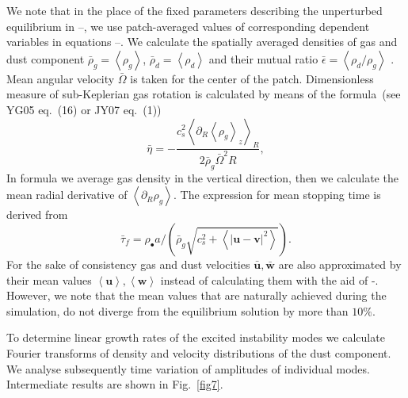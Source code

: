 We note that in the place of the fixed parameters  describing the unperturbed
equilibrium  in --, we use patch-averaged values of
corresponding dependent variables in equations --. 
We calculate the spatially averaged densities of gas and dust component
$\bar{\rho}_g = \left<\rho_g\right>$, $\bar{\rho}_d = \left<\rho_d\right>$ and
their mutual ratio $\bar{\epsilon} = \left<\rho_d / \rho_g\right>$ . Mean
angular velocity $\bar{\Omega}$ is taken for the center of the patch.
Dimensionless measure of sub-Keplerian gas rotation is calculated by means of
the formula~(see YG05 eq.~(16) or JY07 eq.~(1))
%
\begin{equation}
   \bar{\eta} = -\frac{c_s^2\left<\partial_R \left<\rho_g\right>_z\right>_R}
      {2\bar{\rho}_g\bar{\Omega}^2 R},
   \label{eq:eta}
\end{equation}
%
In formula  we average gas density in the vertical direction, then
we calculate the mean radial derivative of $\left<\partial_R \rho_g\right>$. 
The expression for mean stopping time is derived from 
\begin{equation}
   \bar{\tau}_f = \rho_\bullet a / \left(\bar{\rho}_g \sqrt{c_s^2 +
   \left<\left|\mathbf{u} - \mathbf{v}\right|^2\right>} \right).
\end{equation}
%
For the sake of consistency gas and dust velocities $\bar{\mathbf{u}},
\bar{\mathbf{w}}$ are also approximated by their mean values
$\left<\mathbf{u}\right>, \left<\mathbf{w}\right>$ instead of calculating them
with the aid of -. However, we note that the mean values
that are naturally achieved during the simulation,  do not diverge from the
equilibrium solution by more than $10\%$. 

To determine linear growth rates of the excited instability modes we calculate
Fourier transforms of density and velocity distributions of the dust component.
We analyse subsequently time variation of amplitudes of individual modes.
Intermediate results are shown in Fig.~\ref{fig7}. 

